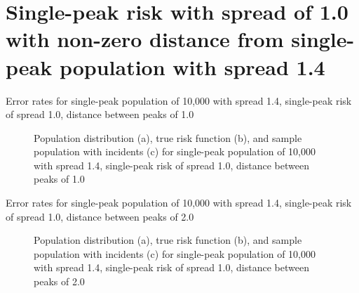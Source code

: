{%
\section[Single-peak risk with spread with non-zero distance from single-peak population]
    {Single-peak risk with spread of 1.0 with non-zero distance from single-peak population with spread 1.4}
\label{sec:app:results_p1.4_100_1_1h_X}


\begin{table}[H]
    
    \caption[]{Error rates for single-peak population of 10,000 with \gls{spread} 1.4, single-peak risk of \gls{spread} 1.0, distance between peaks of 1.0}
    \label{tab:mean_error_rates:p1.4_100_1_1h_1s}
\end{table}

\begin{figure}[H]
    
    \caption[]{Population distribution (a), true risk function (b), and sample population with incidents (c) for single-peak population of 10,000 with \gls{spread} 1.4, single-peak risk of \gls{spread} 1.0, distance between peaks of 1.0}
    \label{fig:distributions:p1.4_100_1_1h_1s}    
\end{figure} \newpage


\begin{table}[H]
    
    \caption[]{Error rates for single-peak population of 10,000 with \gls{spread} 1.4, single-peak risk of \gls{spread} 1.0, distance between peaks of 2.0}
    \label{tab:mean_error_rates:p1.4_100_1_1h_2s}
\end{table}

\begin{figure}[H]
    
    \caption[]{Population distribution (a), true risk function (b), and sample population with incidents (c) for single-peak population of 10,000 with \gls{spread} 1.4, single-peak risk of \gls{spread} 1.0, distance between peaks of 2.0}
    \label{fig:distributions:p1.4_100_1_1h_2s}    
\end{figure} \newpage

}

